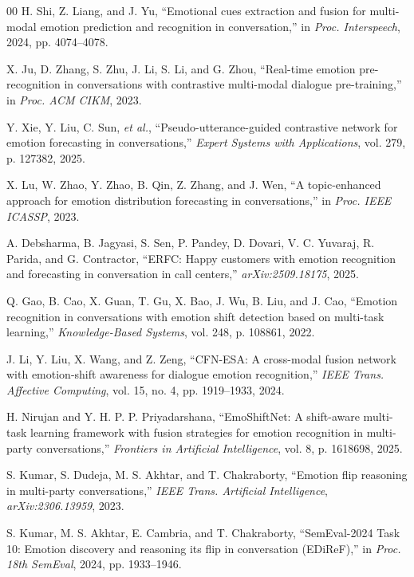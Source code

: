 \documentclass[conference]{IEEEtran}
\begin{document}
\begin{thebibliography}{00}
 H. Shi, Z. Liang, and J. Yu, ``Emotional cues extraction and fusion for
multi-modal emotion prediction and recognition in conversation,'' in \emph{Proc. Interspeech},
2024, pp. 4074--4078.

 X. Ju, D. Zhang, S. Zhu, J. Li, S. Li, and G. Zhou, ``Real-time emotion
pre-recognition in conversations with contrastive multi-modal dialogue pre-training,'' in
\emph{Proc. ACM CIKM}, 2023.

 Y. Xie, Y. Liu, C. Sun, \emph{et al.}, ``Pseudo-utterance-guided contrastive
network for emotion forecasting in conversations,'' \emph{Expert Systems with Applications}, vol.
279, p. 127382, 2025.

 X. Lu, W. Zhao, Y. Zhao, B. Qin, Z. Zhang, and J. Wen, ``A topic-enhanced
approach for emotion distribution forecasting in conversations,'' in \emph{Proc. IEEE ICASSP},
2023.

 A. Debsharma, B. Jagyasi, S. Sen, P. Pandey, D. Dovari, V. C. Yuvaraj,
R. Parida, and G. Contractor, ``ERFC: Happy customers with emotion recognition and forecasting in
conversation in call centers,'' \emph{arXiv:2509.18175}, 2025.

 Q. Gao, B. Cao, X. Guan, T. Gu, X. Bao, J. Wu, B. Liu, and J. Cao, ``Emotion
recognition in conversations with emotion shift detection based on multi-task learning,''
\emph{Knowledge-Based Systems}, vol. 248, p. 108861, 2022.

 J. Li, Y. Liu, X. Wang, and Z. Zeng, ``CFN-ESA: A cross-modal fusion network
with emotion-shift awareness for dialogue emotion recognition,'' \emph{IEEE Trans. Affective
Computing}, vol. 15, no. 4, pp. 1919--1933, 2024.

 H. Nirujan and Y. H. P. P. Priyadarshana, ``EmoShiftNet: A
shift-aware multi-task learning framework with fusion strategies for emotion recognition in
multi-party conversations,'' \emph{Frontiers in Artificial Intelligence}, vol. 8, p. 1618698, 2025.

 S. Kumar, S. Dudeja, M. S. Akhtar, and T. Chakraborty, ``Emotion flip
reasoning in multi-party conversations,'' \emph{IEEE Trans. Artificial Intelligence},
\emph{arXiv:2306.13959}, 2023.

 S. Kumar, M. S. Akhtar, E. Cambria, and T. Chakraborty, ``SemEval-2024
Task 10: Emotion discovery and reasoning its flip in conversation (EDiReF),'' in \emph{Proc. 18th
SemEval}, 2024, pp. 1933--1946.


\end{thebibliography}
\end{document}
